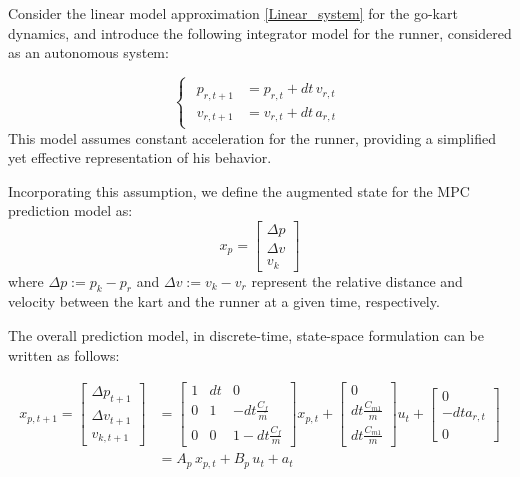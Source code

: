 \documentclass[a4paper,12pt,oneside]{book}
\begin{document}
\bigskip
Consider the linear model approximation \eqref{Linear_system} for the go-kart dynamics, and introduce the following integrator model for the runner, considered as an autonomous system:

\begin{equation}
\begin{cases}
	\begin{aligned}
		p_{r,t+1} &= p_{r,t} + dt \, v_{r,t} \\
		v_{r,t+1} &= v_{r,t} + dt \, a_{r,t}
	\end{aligned}
\end{cases}
\label{Runner_model}
\end{equation}
This model assumes constant acceleration for the runner, providing a simplified yet effective representation of his behavior.

Incorporating this assumption, we define the augmented state for the MPC prediction model as:
\begin{equation}
    x_p = 
    \begin{bmatrix}
        \Delta p  \\
        \Delta v \\
        v_k
    \end{bmatrix}
\end{equation}
where $\Delta p := p_k - p_r$ and $\Delta v := v_k - v_r$ represent the relative distance and velocity between the kart and the runner at a given time, respectively.

The overall prediction model, in discrete-time, state-space formulation can be written as follows:

\begin{equation}
\begin{aligned}
    x_{p,t+1} = 
        \begin{bmatrix}
            \Delta p_{t+1}  \\
            \Delta v_{t+1} \\
            v_{k,t+1}
        \end{bmatrix}
        & =
        \begin{bmatrix}
            1 & dt & 0 \\
            0 & 1 & -dt\frac{C_f}{m} \\
            0 & 0 & 1-dt\frac{C_f}{m}
        \end{bmatrix}
        x_{p,t}
        +
        \begin{bmatrix}
            0 \\
            dt \frac{C_{m1}}{m} \\
            dt \frac{C_{m1}}{m}
        \end{bmatrix}
        u_t + 
        \begin{bmatrix}
        0 \\
        - dt a_{r,t} \\
        0
        \end{bmatrix} \\
        & = A_p \, x_{p,t} + B_p \, u_t + a_t
\end{aligned}
\label{Prediction_model_MPC}
\end{equation}
\end{document}
